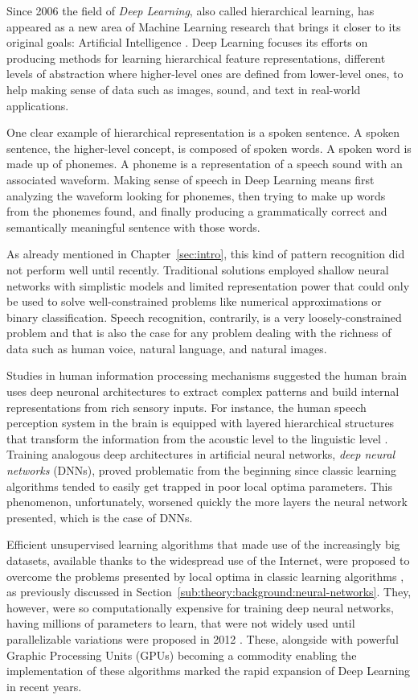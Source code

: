 Since 2006 the field of \emph{Deep Learning}, also called hierarchical learning, has appeared as a new area of Machine Learning research that brings it closer to its original goals: Artificial Intelligence \cite{Deng2014}.
Deep Learning focuses its efforts on producing methods for learning hierarchical feature representations, different levels of abstraction where higher-level ones are defined from lower-level ones, to help making sense of data such as images, sound, and text in real-world applications.

One clear example of hierarchical representation is a spoken sentence.
A spoken sentence, the higher-level concept, is composed of spoken words.
A spoken word is made up of phonemes.
A phoneme is a representation of a speech sound with an associated waveform.
Making sense of speech in Deep Learning means first analyzing the waveform looking for phonemes, then trying to make up words from the phonemes found, and finally producing a grammatically correct and semantically meaningful sentence with those words.

As already mentioned in Chapter~\ref{sec:intro}, this kind of pattern recognition did not perform well until recently.
Traditional solutions employed shallow neural networks with simplistic models and limited representation power that could only be used to solve well-constrained problems like numerical approximations or binary classification.
Speech recognition, contrarily, is a very loosely-constrained problem and that is also the case for any problem dealing with the richness of data such as human voice, natural language, and natural images.

Studies in human information processing mechanisms suggested the human brain uses deep neuronal architectures to extract complex patterns and build internal representations from rich sensory inputs.
For instance, the human speech perception system in the brain is equipped with layered hierarchical structures that transform the information from the acoustic level to the linguistic level \cite{Deng1999,Baker2009}.
Training analogous deep architectures in artificial neural networks, \emph{deep neural networks} (DNNs), proved problematic from the beginning since classic learning algorithms tended to easily get trapped in poor local optima parameters.
This phenomenon, unfortunately, worsened quickly the more layers the neural network presented, which is the case of DNNs.

Efficient unsupervised learning algorithms that made use of the increasingly big datasets, available thanks to the widespread use of the Internet, were proposed to overcome the problems presented by local optima in classic learning algorithms \cite{LeCun2004,Hinton2006}, as previously discussed in Section~\ref{sub:theory:background:neural-networks}.
They, however, were so computationally expensive for training deep neural networks, having millions of parameters to learn, that were not widely used until parallelizable variations were proposed in 2012 \cite{Dean2012,Chen2012}.
These, alongside with powerful Graphic Processing Units (GPUs) becoming a commodity enabling the implementation of these algorithms marked the rapid expansion of Deep Learning in recent years.

